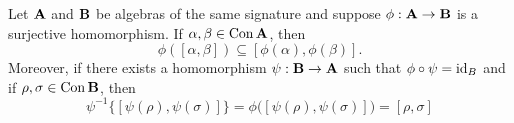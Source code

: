 \begin{lem}
  Let $\mathbf{A}$ and $\mathbf{B}$ be algebras of the same signature and suppose
  $\phi: \mathbf{A} \to \mathbf{B}$ is a surjective homomorphism.  If
  $\alpha, \beta \in \operatorname{Con} \mathbf{A}$, then
  \[
  \phi([\alpha, \beta]) \subseteq [\phi(\alpha), \phi(\beta)].
  \]
  Moreover, if there exists a homomorphism $\psi: \mathbf{B} \to \mathbf{A}$ such that
  $\phi \circ \psi = \operatorname{id}_B$ and if $\rho, \sigma \in \operatorname{Con} \mathbf{B}$, then
  \[
  \psi^{-1} \{[\psi(\rho), \psi(\sigma)]\} = \phi\bigl( [\psi(\rho), \psi(\sigma)]\bigr)
  = [\rho, \sigma]
  \]
\end{lem}



\begin{comment}
  
\subsection{Necessary conditions for existence of difference terms}

In this subsection we recall some well known results about varieties that have
difference terms.

\begin{lem}[\protect{\cite[Lemma 2.2]{MR1358491}}]
  If $\sV$ has a difference term, $\bA \in \sV$ and
  $\alpha, \beta \in \Con \bA$, then $[\alpha, \beta] = [\beta, \alpha]$.
\end{lem}

\begin{lem}[\protect{\cite[Lemma 2.8]{MR1358491}}]
  \label{lem:dt-complete-join-preserving}
  If $\sV$ has a difference term, $\bA \in \sV$ and
  $\alpha_i \in \Con\bA$ for $i \in I$, then
  \[
  \Join \comm {\alpha_i} {\alpha_i} {=}
  \comm {\Join \alpha_i} {\Join \alpha_i}.
  \]
\end{lem}

\medskip

\noindent {\bf Questions:}
  Does the analog of Lemma~\ref{lem:dt-complete-join-preserving} hold for complete
  meets?
  Does Lemma~\ref{lem:dt-complete-join-preserving} hold 
  for ``mixed congruences?'' That is, 
  assuming also that $\beta_i\in \Con \bA$, do we have
  \[
  \Join \comm {\alpha_i} {\beta_i} {=}
  \comm {\Join \alpha_i} {\Join \beta_i}\; ?
  \]


\end{comment}
